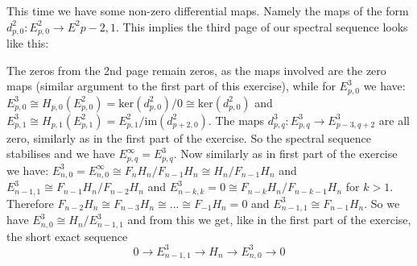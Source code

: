 \documentclass{article}
\begin{document}

This time we have some non-zero differential maps. Namely the maps of the form $d^2_{p,0}: E^2_{p,0} \to E^2{p-2,1}$.
This implies the third page of our spectral sequence looks like this:


The zeros from the 2nd page remain zeros, as the maps involved are the zero maps (similar argument to the first part of this exercise),
while for $E^3_{p,0}$ we have: $E^3_{p,0} \cong H_{p,0}(E^2_{p,0}) = \mathrm{ker} (d^2_{p,0})/0 \cong \mathrm{ker} (d^2_{p,0})$ and
$E^3_{p,1} \cong H_{p,1}(E^2_{p,1}) = E^2_{p,1} / \mathrm{im}(d^2_{p+2,0})$. The maps $d^3_{p,q} : E^3_{p,q} \to E^3_{p-3,q+2}$ are all zero, similarly as in the first part of the exercise. So the spectral sequence stabilises and we have $E^\infty_{p,q} = E^3_{p,q}$.
Now similarly as in first part of the exercise we have: $E^3_{n,0} = E^\infty_{n,0} \cong F_n H_n/F_{n-1}H_n \cong H_n/F_{n-1}H_n$ and $E^3_{n-1,1} \cong F_{n-1} H_n / F_{n-2} H_n$ and $E^3_{n-k,k} = 0 \cong F_{n-k} H_n / F_{n-k-1} H_n$ for $k>1$. Therefore $F_{n-2} H_n \cong F_{n-3} H_n \cong ... \cong F_{-1} H_n = 0$ and $E^3_{n-1,1} \cong F_{n-1} H_n$. So we have $E^3_{n,0} \cong H_n/E^3_{n-1,1}$ and from this we get, like in the first part of the exercise, the short exact sequence
\begin{equation*}
0 \to E^3_{n-1,1} \to H_n \to E^3_{n,0} \to 0
\end{equation*}
\end{document}
